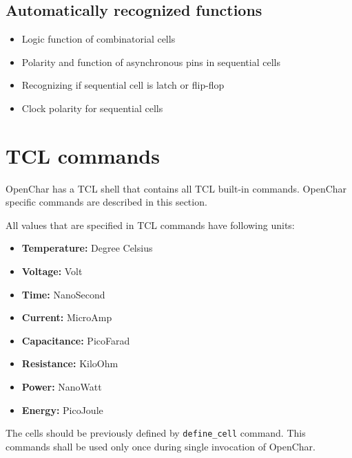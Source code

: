 \documentclass[12pt, a4paper]{article}
\begin{document}
\subsection{Automatically recognized functions}

\begin{itemize}
    \item{Logic function of combinatorial cells}
    \item{Polarity and function of asynchronous pins in sequential cells}
    \item{Recognizing if sequential cell is latch or flip-flop}
    \item{Clock polarity for sequential cells}
\end{itemize}


\pagebreak
\section{TCL commands}

OpenChar has a TCL shell that contains all TCL built-in commands.
OpenChar specific commands are described in this section.

All values that are specified in TCL commands have following units:
\begin{itemize}
    \item{\textbf{Temperature:} Degree Celsius}
    \item{\textbf{Voltage:} Volt}
    \item{\textbf{Time:} NanoSecond}
    \item{\textbf{Current:} MicroAmp}
    \item{\textbf{Capacitance:} PicoFarad}
    \item{\textbf{Resistance:} KiloOhm}
    \item{\textbf{Power:} NanoWatt}
    \item{\textbf{Energy:} PicoJoule}
\end{itemize}




The cells should be previously defined by \texttt{define_cell} command.
This commands shall be used only once during single invocation of OpenChar.


\end{document}
